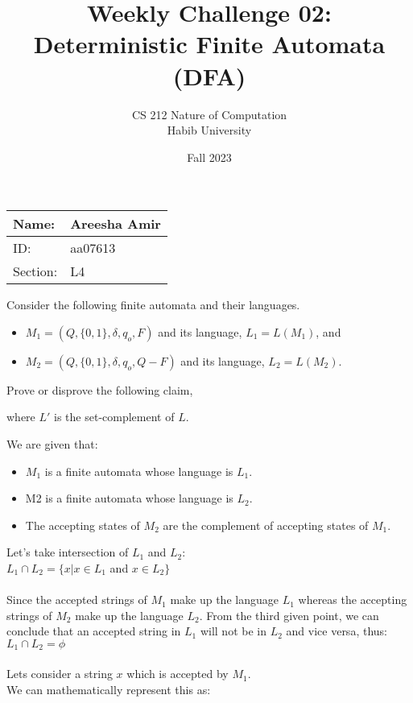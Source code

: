 \documentclass[a4paper]{exam}
\title{Weekly Challenge 02: Deterministic Finite Automata (DFA)}
\author{CS 212 Nature of Computation\\Habib University}
\date{Fall 2023}
\begin{document}
\maketitle

	\begin{tabularx}{\textwidth}{|X|X|}

		\hline
    Name:& Areesha Amir  \\ \hline 
    ID: & aa07613 \\ \hline 
    Section: & L4 \\ \hline 
		
   
	\end{tabularx}

\begin{questions}


  

  Consider the following finite automata and their languages.
  \begin{itemize}
  \item $M_1=(Q, \{0,1\}, \delta, q_o, F)$ and its language, $L_1=L(M_1)$, and
  \item $M_2=(Q, \{0,1\}, \delta, q_o, Q-F)$ and its language, $L_2=L(M_2)$.
  \end{itemize}

  Prove or disprove the following claim,
  
  \centerline{
  }
  where $L'$ is the set-complement of $L$.

  \begin{solution}

    We are given that:
    \begin{itemize}
      \item $M_1$ is a finite automata whose language is $L_1$.
      \item M2 is a finite automata whose language is $L_2$.
      \item The accepting states of $M_2$ are the complement of accepting states of $M_1$. 
    \end{itemize}

    Let's take intersection of $L_1$ and $L_2$:
    \\ 
    $L_1 \cap L_2 = \{x | x \in L_1$ and $x \in L_2 \}$ \\
    \\Since the accepted strings of $M_1$ make up the language $L_1$ whereas the
     accepting strings of $M_2$ make up the language $L_2$. From the third given point, we can
      conclude that an accepted string in $L_1$ will not be in $L_2$ and vice versa, thus: \\
    $L_1 \cap L_2 = \phi $ \\ \\
    Lets consider a string $x$ which is accepted by $M_1$. 
   \\ We can mathematically represent this as:
   

\end{solution}
\end{questions}
\end{document}
